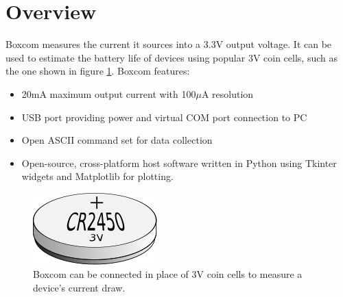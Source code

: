 \section{Overview}
Boxcom measures the current it sources into a 3.3V output voltage.  It
can be used to estimate the battery life of devices using popular 3V
coin cells, such as the one shown in figure \ref{fig:coincell}.  Boxcom features:
\begin{itemize}
  \item 20mA maximum output current with 100$\mu$A resolution
  \item USB port providing power and virtual COM port connection to PC
  \item Open ASCII command set for data collection
  \item Open-source, cross-platform host software written in Python
    using Tkinter widgets and Matplotlib for plotting.
\end{itemize}

\begin{figure}[ht]
  \begin{center}
    \includegraphics[clip,scale=1]{figs/coincell}
    \caption{Boxcom can be connected in place of 3V coin
      cells to measure a device's current draw.\label{fig:coincell}}
    \end{center}
\end{figure}